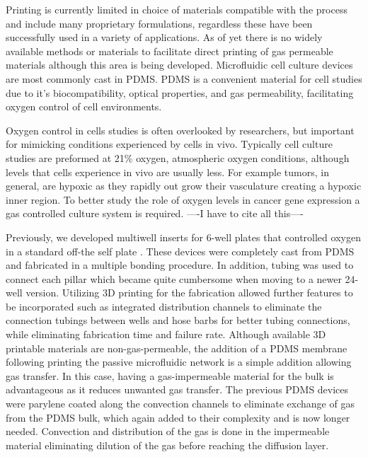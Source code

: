Printing is currently limited in choice of materials compatible with the process and include many proprietary formulations, regardless these have been successfully used in a variety of applications.
As of yet there is no widely available methods or materials to facilitate direct printing of gas permeable materials although this area is being developed\cite{Femmer2014}.
Microfluidic cell culture devices are most commonly cast in PDMS.
PDMS is a convenient material for cell studies due to it's biocompatibility, optical properties, and gas permeability, facilitating oxygen control of cell environments.

Oxygen control in cells studies is often overlooked by researchers, but important for mimicking conditions experienced by cells in vivo.
Typically cell culture studies are preformed at 21\% oxygen, atmospheric oxygen conditions, although levels that cells experience in vivo are usually less.
For example tumors, in general, are hypoxic as they rapidly out grow their vasculature creating a hypoxic inner region. 
To better study the role of oxygen levels in cancer gene expression a gas controlled culture system is required. ----I have to cite all this----

Previously, we developed multiwell inserts for 6-well plates that controlled oxygen in a standard off-the self plate \cite{Oppegard2009, Oppegard2010}.
These devices were completely cast from PDMS and fabricated in a multiple bonding procedure.
In addition, tubing was used to connect each pillar which became quite cumbersome when moving to a newer 24-well version.
Utilizing 3D printing for the fabrication allowed further features to be incorporated such as integrated distribution channels to eliminate the connection tubings between wells and hose barbs for better tubing connections, while eliminating fabrication time and failure rate.
Although available 3D printable materials are non-gas-permeable, the addition of a PDMS membrane following printing the passive microfluidic network is a simple addition allowing gas transfer. 
In this case, having a gas-impermeable material for the bulk is advantageous as it reduces unwanted gas transfer. 
The previous PDMS devices were parylene coated along the convection channels to eliminate exchange of gas from the PDMS bulk, which again added to their complexity and is now longer needed.
Convection and distribution of the gas is done in the impermeable material eliminating dilution of the gas before reaching the diffusion layer. 

